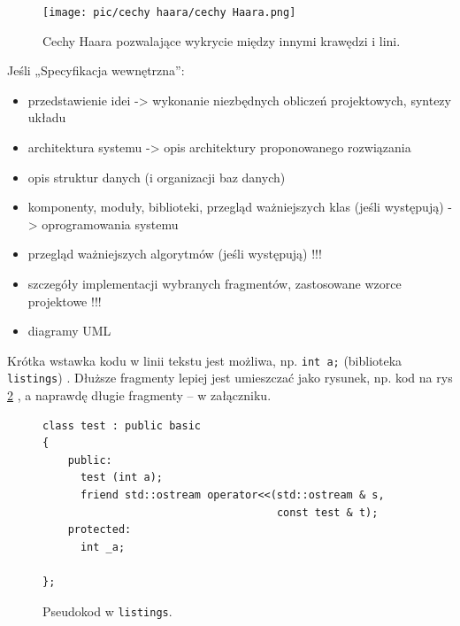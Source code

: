 \documentclass[a4paper,twoside,12pt]{book}
\begin{document}
\begin{figure}[htbp]
	\centering
	\texttt{[image: pic/cechy haara/cechy Haara.png]}
	\caption{Cechy Haara pozwalające wykrycie między innymi krawędzi i lini.}
	\label{fig:Cechy-Haara}
\end{figure}








Jeśli „Specyfikacja wewnętrzna”:
\begin{itemize}
\item przedstawienie idei -> wykonanie niezbędnych obliczeń projektowych, syntezy układu
\item architektura systemu -> opis architektury proponowanego rozwiązania
\item opis struktur danych (i organizacji baz danych)
\item komponenty, moduły, biblioteki, przegląd ważniejszych klas (jeśli występują) -> oprogramowania systemu
\item przegląd ważniejszych algorytmów (jeśli występują) !!!
\item szczegóły implementacji wybranych fragmentów, zastosowane wzorce projektowe !!!
\item diagramy UML
\end{itemize}





Krótka wstawka kodu w linii tekstu jest możliwa, np.  \lstinline|int a;| (biblioteka \texttt{listings})%
. 
Dłuższe fragmenty lepiej jest umieszczać jako rysunek, np. kod na rys \ref{fig:pseudokod:listings}%
, a naprawdę długie fragmenty – w załączniku.


\begin{figure}
\centering
\begin{lstlisting}
class test : public basic
{
    public:
      test (int a);
      friend std::ostream operator<<(std::ostream & s, 
                                     const test & t);
    protected:
      int _a;  
      
};
\end{lstlisting}
\caption{Pseudokod w \texttt{listings}.}
\label{fig:pseudokod:listings}
\end{figure}
\end{document}
